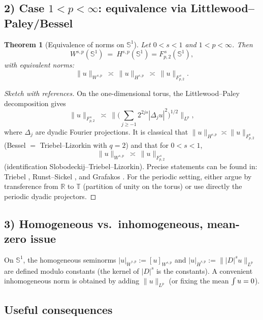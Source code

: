 \documentclass{amsart}
\newcommand{\dashint}{%
  \mathop{%
    \int
  }}
\newcounter{thm}
\newcounter{re}
\newtheorem{theorem}[thm]{Theorem}
\begin{document}
\subsection*{2) Case $1<p<\infty$: equivalence via Littlewood--Paley/Bessel}

\begin{theorem}[Equivalence of norms on $\mathbb S^1$]\label{th:Fp2=Wsp}
Let $0<s<1$ and $1<p<\infty$. Then
\[
W^{s,p}(\mathbb S^1) \ = \ H^{s,p}(\mathbb S^1)=F^{\,s}_{p,2}(\mathbb S^1),
\]
with equivalent norms:
\[
\|u\|_{W^{s,p}} \ \asymp\ \|u\|_{H^{s,p}}
\ \asymp\ \|u\|_{F^{\,s}_{p,2}}.
\]
\end{theorem}

\begin{proof}[Sketch with references]
On the one-dimensional torus, the Littlewood--Paley decomposition gives
\[
\|u\|_{F^{\,s}_{p,2}}\ \asymp\ \big\|\big( \sum_{j\ge-1} 2^{2js}|\Delta_j u|^2\big)^{1/2}\big\|_{L^p},
\]
where \(\Delta_j\) are dyadic Fourier projections. It is classical that
\(\|u\|_{H^{s,p}}\asymp \|u\|_{F^s_{p,2}}\) (Bessel \(=\) Triebel–Lizorkin
with \(q=2\)) and that for \(0<s<1\),
\[
\|u\|_{W^{s,p}} \ \asymp\ \|u\|_{F^{\,s}_{p,2}}
\]
(identification Slobodeckij–Triebel–Lizorkin). Precise statements can be found in:
Triebel \cite[Th.~2.5.12, Th.~2.5.14]{Triebel}, Runst–Sickel \cite[Ch.~3–4]{RunstSickel},
and Grafakos \cite[Th.~6.5.1]{GrafakosCA}. For the periodic setting, either argue by
transference from \(\mathbb R\) to \(\mathbb T\) (partition of unity on the torus) or
use directly the periodic dyadic projectors.
\end{proof}

\subsection*{3) Homogeneous vs.\ inhomogeneous, mean-zero issue}

On $\mathbb S^1$, the homogeneous seminorms
\(
|u|_{\dot W^{s,p}}:=[u]_{W^{s,p}}
\)
and
\(
|u|_{\dot H^{s,p}}:=\||D|^s u\|_{L^p}
\)
are defined modulo constants (the kernel of $|D|^s$ is the constants).
A convenient inhomogeneous norm is obtained by adding $\|u\|_{L^p}$ (or fixing
the mean $\dashint u=0$).

\subsection{Useful consequences}
\end{document}
